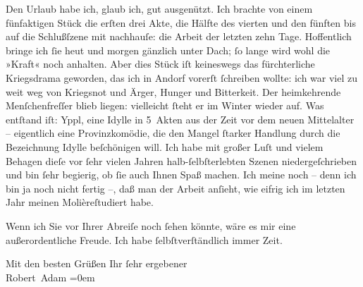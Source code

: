 \pstart
           Den Urlaub habe ich, glaub ich, gut ausgenützt. Ich brachte von einem fünfaktigen Stück die erſten drei Akte, die
               Hälfte des vierten und den fünften bis auf die Schlußſzene mit nachhauſe: die Arbeit
               der letzten zehn Tage. Hoffentlich bringe ich ſie heut und morgen gänzlich unter
               Dach; ſo lange wird wohl die {\pb}»Kraft« noch
               anhalten. Aber dies Stück iſt keineswegs das fürchterliche Kriegsdrama geworden, das ich in Andorf vorerſt ſchreiben wollte: ich war viel zu
               weit weg von Kriegsnot und Ärger, Hunger und Bitterkeit. Der heimkehrende
               Menſchenfreſſer blieb liegen: vielleicht ſteht er im Winter wieder auf. Was entſtand
               iſt: Yppl, eine Idylle in 5 Akten aus der Zeit
               vor dem neuen Mittelalter – eigentlich eine Provinzkomödie, die den Mangel ſtarker
               Handlung durch die Bezeichnung Idylle beſchönigen will. Ich habe mit großer Luſt und
               vielem Behagen dieſe vor ſehr vielen Jahren halb-ſelbſterlebten Szenen
               niedergeſchrieben und bin ſehr begierig, ob ſie auch Ihnen Spaß machen. Ich meine
               noch – denn ich bin ja noch nicht fertig –, daß man der Arbeit anſieht, wie eifrig
               ich im letzten Jahr meinen Molièreſtudiert habe.\pend
           
\pstart
           {\pb}Wenn ich Sie vor Ihrer Abreiſe noch ſehen
               könnte, wäre es mir \introOben{}eine\introOben{} außerordentliche Freude. Ich habe
               ſelbſtverſtändlich immer Zeit.\pend
           
\pstart
           Mit den besten Grüßen Ihr ſehr ergebener{\\[\baselineskip]}\spacefill\mbox{Robert Adam}\pend
           \leftskip=0em{}\endnumbering{}  
      
